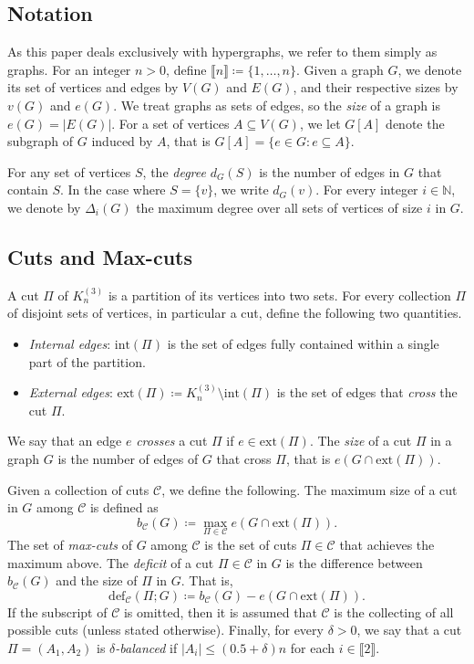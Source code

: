 \documentclass[11pt,a4paper,oneside,reqno]{amsart}
\newcommand{\cC}{\mathcal{C}}
\newcommand{\1}{\mathbbm{1}} %
\newcommand{\br}[1]{\llbracket{#1}\rrbracket}
\renewcommand{\le}{\leqslant}
\newcommand{\deficit}{\mathrm{def}}
\newcommand{\ext}{\mathrm{ext}}
\begin{document}
\subsection{Notation}
As this paper deals exclusively with hypergraphs, we refer to them simply as graphs. For an integer $n > 0$, define $\br{n} \coloneqq \{1, \dots, n\}$.
Given a graph $G$, we denote its set of vertices and edges by $V(G)$ and $E(G)$, and their respective sizes by $v(G)$ and $e(G)$.
We treat graphs as sets of edges, so the \textit{size} of a graph is $e(G) = |E(G)|$. For a set of vertices $A \subseteq V(G)$, we let $G[A]$ denote the subgraph of $G$ induced by $A$, that is $G[A] = \{e \in G \colon e \subseteq A\}$.

For any set of vertices $S$, the \textit{degree} $d_G(S)$ is the number of edges in $G$ that contain $S$. In the case where $S = \{v\}$, we write $d_G(v)$. For every integer $i \in \mathbb{N}$, we denote by $\Delta_i(G)$ the maximum degree over all sets of vertices of size $i$ in $G$.

\subsection*{Cuts and Max-cuts} 
A cut $\Pi$ of $K_n^{(3)}$ is a partition of its vertices into two sets. For every collection $\Pi$ of disjoint sets of vertices, in particular a cut, define the following two quantities.
\begin{itemize}
    \item \textit{Internal edges}: $\text{int}(\Pi)$ is the set of edges fully contained within a single part of the partition.
    \item \textit{External edges}: $\text{ext}(\Pi) \coloneqq K_n^{(3)} \setminus \text{int}(\Pi)$ is the set of edges that \textit{cross} the cut $\Pi$.
\end{itemize}
We say that an edge $e$ \textit{crosses} a cut $\Pi$ if $e \in \ext(\Pi)$. The \textit{size} of a cut $\Pi$ in a graph $G$ is the number of edges of $G$ that cross $\Pi$, that is $e(G \cap \ext(\Pi))$. 

Given a collection of cuts $\cC$, we define the following. The maximum size of a cut in $G$ among $\mathcal{C}$ is defined as
\[
    b_{\cC}(G) \coloneqq \max_{\Pi \in \cC} e\left(G \cap \ext(\Pi)\right).
\] 
The set of \textit{max-cuts} of $G$ among $\cC$ is the set of cuts $\Pi \in \cC$ that achieves the maximum above.
The \textit{deficit} of a cut $\Pi \in \cC$ in $G$ is the difference between $b_{\cC}(G)$ and the size of $\Pi$ in $G$. That is,
\[
    \deficit_{\cC}(\Pi; G) \coloneqq b_{\cC}(G) - e(G \cap \ext(\Pi)).
\]
If the subscript of $\cC$ is omitted, then it is assumed that $\cC$ is the collecting of all possible cuts (unless stated otherwise).
Finally, for every $\delta > 0$, we say that a cut $\Pi = (A_1, A_2)$ is \textit{$\delta$-balanced} if $|A_i| \le (0.5 + \delta)n$ for each $i \in \br{2}$. 
\end{document}
